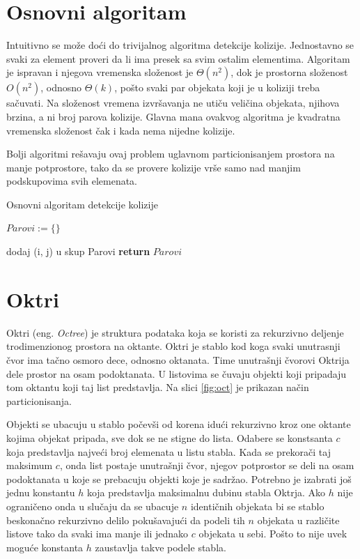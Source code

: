 \documentclass[12pt,oneside]{memoir}
\begin{document}
\section{Osnovni algoritam}
\label{subsec:triv}

Intuitivno se može doći do trivijalnog algoritma detekcije kolizije. 
Jednostavno se svaki za element proveri da li ima presek sa svim ostalim elementima.
Algoritam je ispravan i njegova vremenska složenost je $\Theta (n^2) $, dok je prostorna složenost
$O(n^2)$, odnosno $\Theta(k)$, pošto svaki par objekata koji je u koliziji treba sačuvati.
Na složenost vremena izvršavanja ne utiču veličina objekata, njihova brzina, a ni broj parova kolizije.
Glavna mana ovakvog algoritma je kvadratna vremenska složenost čak i kada nema nijedne kolizije.

Bolji algoritmi rešavaju ovaj problem uglavnom particionisanjem prostora na manje potprostore, tako da
se provere kolizije vrše samo nad manjim podskupovima svih elemenata.

\begin{algorithm}
	\caption{Osnovni algoritam detekcije kolizije}
    \label{alg:triv}
	\begin{algorithmic}[1]
		\State $Parovi := \{ \}$

				\State dodaj (i, j) u skup Parovi
			\EndIf		
		\EndFor
		\EndFor
		\State \textbf{return} $Parovi$
		\EndProcedure
    \end{algorithmic}
\end{algorithm}

\section{Oktri}
\label{subsec:octree}

Oktri (eng. {\em Octree}) je struktura podataka koja se koristi za rekurzivno deljenje trodimenzionog
prostora na oktante. Oktri je stablo kod koga svaki unutrasnji čvor ima tačno osmoro dece, odnosno oktanata. 
Time unutrašnji čvorovi Oktrija dele prostor na osam podoktanata.
U listovima se čuvaju objekti koji pripadaju tom oktantu koji taj list predstavlja.
Na slici \ref{fig:oct} je prikazan način particionisanja.

Objekti se ubacuju u stablo počevši od korena idući rekurzivno kroz one oktante kojima objekat pripada,
sve dok se ne stigne do lista.
Odabere se konstsanta $c$ koja predstavlja najveći broj elemenata u listu stabla. 
Kada se prekorači taj maksimum $c$, onda list postaje unutrašnji čvor, njegov potprostor se deli 
na osam podoktanata u koje se prebacuju objekti koje je sadržao.
Potrebno je izabrati još jednu konstantu $h$ koja predstavlja maksimalnu dubinu stabla Oktrja.
Ako $h$ nije ograničeno onda u slučaju da se ubacuje $n$ identičnih objekata bi se stablo 
beskonačno rekurzivno delilo pokušavajući da podeli tih $n$ objekata u različite listove 
tako da svaki ima manje ili jednako $c$ objekata u sebi. 
Pošto to nije uvek moguće konstanta $h$ zaustavlja takve podele stabla.
\end{document}
